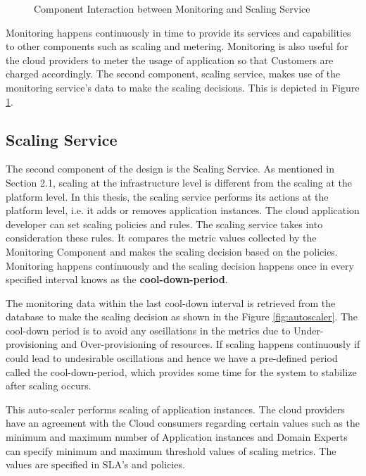 \documentclass[article,type=msc,colorback,12pt,accentcolor=tud8b,table]{tudthesis}
\begin{document}
 	 	 \begin{figure}[!h]
 	 	 	\begin{center}
 	 	 		\makebox[\textwidth]{\texttt{[image: C4]}}
 	 	 	\end{center}
 	 	 	\caption{Component Interaction between Monitoring and Scaling Service}
 	 	 	\label{fig:monitor_scaling}
 	 	 \end{figure}
 	 	 
 	 	 Monitoring happens continuously in time to provide its services and capabilities to other components such as scaling and metering. Monitoring is also useful for the cloud providers to meter the usage of application so that Customers are charged accordingly. The second component, scaling service, makes use of the monitoring service's data to make the scaling decisions. This is depicted in Figure \ref{fig:monitor_scaling}.
 	
 	\subsection{Scaling Service}
 	
		The second component of the design is the Scaling Service. As mentioned in Section 2.1, scaling at the infrastructure level is different from the scaling at the platform level. In this thesis, the scaling service performs its actions at the platform level, i.e. it adds or removes application instances. The cloud application developer can set scaling policies and rules. The scaling service takes into consideration these rules. It compares the metric values collected by the Monitoring Component and makes the scaling decision based on the policies. Monitoring happens continuously and the scaling decision happens once in every specified interval knows as the \textbf{cool-down-period}. 
		
	\par The monitoring data within the last cool-down interval is retrieved from the database to make the scaling decision as shown in the Figure \ref{fig:autoscaler}. The cool-down period is to avoid any oscillations in the metrics due to Under-provisioning and Over-provisioning of resources. If scaling happens continuously if could lead to undesirable oscillations and hence we have a pre-defined period called the cool-down-period, which provides some time for the system to stabilize after scaling occurs. 	
		
 	This auto-scaler performs scaling of application instances. The cloud providers have an agreement with the Cloud consumers regarding certain values such as the minimum and maximum number of Application instances and Domain Experts can specify minimum and maximum threshold values of scaling metrics. The values are specified in SLA's and policies.
 
\end{document}
